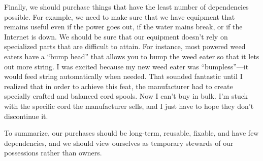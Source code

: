 \begin{infonote}
Finally, we should purchase things that have the least number of
dependencies possible.
For example, we need
to make sure that we have equipment that remains useful even if the
power goes out, if the water mains break, or if the Internet is down.
We should be sure that our equipment doesn't rely on
specialized parts that are difficult to attain. For instance, most
powered weed eaters have a “bump head” that allows you to bump the weed
eater so that it lets out more string. I was excited because my new
weed eater was “bumpless”—it would feed string automatically when
needed. That sounded fantastic until I realized that in order to
achieve this feat, the manufacturer had to create specially crafted and
balanced cord spools. Now I can't buy in bulk.
I'm stuck with the specific cord the manufacturer
sells, and I just have to hope they don't discontinue
it.

To summarize, our purchases should be long-term, reusable, fixable, and
have few dependencies, and we should view ourselves as temporary
stewards of our possessions rather than owners.
\end{infonote}
